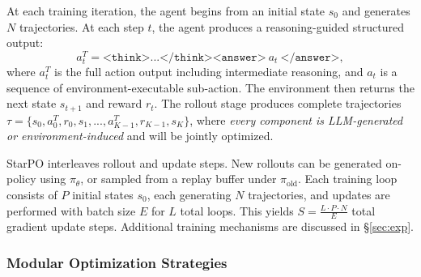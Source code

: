 At each training iteration, the agent begins from an initial state $s_0$ and generates $N$ trajectories. At each step $t$, the agent produces a reasoning-guided structured output:
\begin{equation}
    a^T_t = \texttt{<think>}...\texttt{</think><answer>}~a_t~\texttt{</answer>},
\end{equation}
where $a^T_t$ is the full action output including intermediate reasoning, and $a_t$ is a sequence of environment-executable sub-action. The environment then returns the next state $s_{t+1}$ and reward $r_t$. The rollout stage produces complete trajectories $\tau = \{s_0, a^T_0, r_0, s_1, ..., a^T_{K-1}, r_{K-1}, s_K\}$, where \textit{every component is LLM-generated or environment-induced} and will be jointly optimized.

StarPO interleaves rollout and update steps.
New rollouts can be generated on-policy using $\pi_\theta$, or sampled from a replay buffer under $\pi_{\text{old}}$.
Each training loop consists of $P$ initial states $s_0$, each generating $N$ trajectories, and updates are performed with batch size $E$ for $L$ total loops. This yields $S = \frac{L \cdot P \cdot N}{E}$ total gradient update steps. Additional training mechanisms are discussed in \S\ref{sec:exp}.


\subsubsection{Modular Optimization Strategies}

